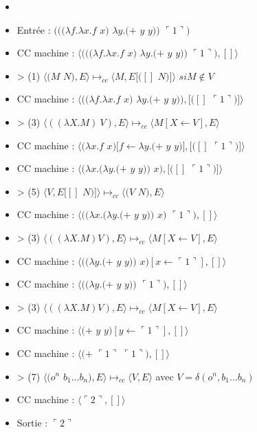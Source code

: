 \documentclass[10pt,a4paper]{article}
\begin{document}
				\begin{itemize}
					\item[]
					\item[] Entrée : $(((\lambda f.\lambda x.f$ $x)$ $\lambda y.(+$ $y$ $y))$ $\ulcorner 1\urcorner)$
					\smallbreak
					\item[] CC machine : $\langle(((\lambda f.\lambda x.f$ $x)$ $\lambda y.(+$ $y$ $y))$ $\ulcorner 1\urcorner),[]\rangle$
					\item[] > (1) $\langle(M$ $N),E\rangle \longmapsto_{cc} \langle M,E[([]$ $N)]\rangle$ $si M \notin V$
					\item[] CC machine : $\langle((\lambda f.\lambda x.f$ $x)$ $\lambda y.(+$ $y$ $y)),[([]$ $\ulcorner 1\urcorner)]\rangle$
					\item[] > (3) $\langle((\lambda X.M)~V),E\rangle \longmapsto_{cc} \langle M[X\longleftarrow V],E\rangle$
					\item[] CC machine : $\langle(\lambda x.f$ $x)[f \leftarrow \lambda y.(+$ $y$ $y)],[([]$ $\ulcorner 1\urcorner)]\rangle$
					\item[] CC machine : $\langle(\lambda x.(\lambda y.(+$ $y$ $y))$ $x),[([]$ $\ulcorner 1\urcorner)]\rangle$
					\item[] > (5) $\langle V,E[[]$ $N)]\rangle \longmapsto_{cc} \langle(V$ $N),E\rangle$ 
					\item[] CC machine : $\langle((\lambda x.(\lambda y.(+$ $y$ $y))$ $x)$ $\ulcorner 1\urcorner),[]\rangle$
					\item[] > (3) $\langle((\lambda X.M) V),E\rangle \longmapsto_{cc} \langle M[X\longleftarrow V],E\rangle$
					\item[] CC machine : $\langle((\lambda y.(+$ $y$ $y))$ $x)[x \leftarrow \ulcorner 1\urcorner],[]\rangle$
					\item[] CC machine : $\langle((\lambda y.(+$ $y$ $y))$ $\ulcorner 1\urcorner),[]\rangle$
					\item[] > (3) $\langle((\lambda X.M) V),E\rangle \longmapsto_{cc} \langle M[X\longleftarrow V],E\rangle$
					\item[] CC machine : $\langle(+$ $y$ $y)[y \leftarrow \ulcorner 1\urcorner],[]\rangle$
					\item[] CC machine : $\langle(+$ $\ulcorner 1\urcorner$ $\ulcorner 1\urcorner),[]\rangle$
					\item[] > (7) $\langle(o^{n}$ $b_{1}...b_{n}),E\rangle \longmapsto_{cc}  \langle V,E\rangle$ avec $V = \delta(o^{n},b_{1}...b_{n})$
					\item[] CC machine : $\langle\ulcorner 2\urcorner,[]\rangle$
					\item[] \smallbreak
					Sortie : $\ulcorner 2\urcorner$
				\end{itemize}
				\newpage
			
\end{document}
